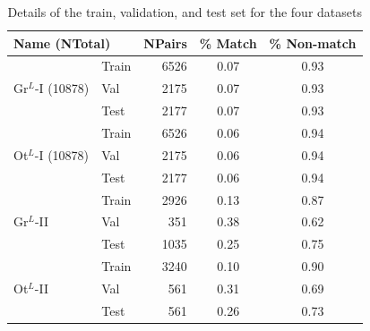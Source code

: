 \begin{table}[t]
\captionsetup{justification=centering}
  \caption{Details of the train, validation, and test set for the four datasets}
\centering
  \begin{tabular}{llrcc}
    \toprule
    \multicolumn{2}{l}{Name (NTotal)}      & NPairs & \% Match & \% Non-match \\
    \midrule
    \multirow{3}{*}{Gr$^{L}$-I (10878)}  & Train & 6526 & 0.07 & 0.93 \\
                                 & Val   & 2175 & 0.07 & 0.93 \\
                          & Test  & 2177 & 0.07 & 0.93 \\
\midrule
\multirow{3}{*}{Ot$^{L}$-I (10878)}  & Train & 6526 & 0.06 & 0.94 \\
                                 & Val   & 2175 & 0.06 & 0.94 \\
                                 & Test  & 2177 & 0.06 & 0.94 \\
\midrule
  \multirow{3}{*}{Gr$^{L}$-II} & Train & 2926 & 0.13 & 0.87\\
                                 & Val   & 351 & 0.38 & 0.62\\
                                 & Test  & 1035 & 0.25 & 0.75\\
    \midrule
    \multirow{3}{*}{Ot$^{L}$-II} & Train & 3240 & 0.10 & 0.90\\
                                 & Val   & 561 & 0.31 & 0.69\\
                                 & Test  & 561& 0.26 & 0.73\\
    \bottomrule
  \end{tabular}
  \label{tab:results_tvt}
\end{table}

